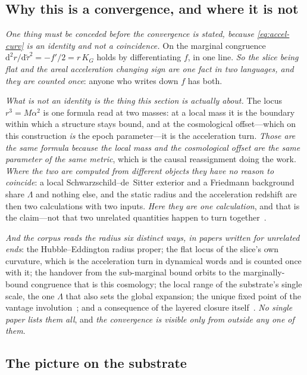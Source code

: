 \documentclass[11pt,a4paper]{article}
\newcommand{\dd}{\mathrm{d}}
\theoremstyle{plain}
\theoremstyle{definition}
\begin{document}
\subsection{Why this is a convergence, and where it is not}

\emph{One thing must be conceded before the convergence is stated, because \eqref{eq:accel-curv} is an
identity and not a coincidence.} On the marginal congruence $\dd^{2}r/\dd\tilde\tau^{2}=-f'/2=r\,K_{G}$
holds by differentiating $f$, in one line. \emph{So the slice being flat and the areal acceleration changing
sign are one fact in two languages, and they are counted once}: anyone who writes down $f$ has both.

\emph{What is not an identity is the thing this section is actually about.} The locus $r^{3}=M\alpha^{2}$ is
one formula read at two masses: at a local mass it is the boundary within which a structure stays bound, and
at the cosmological offset---which on this construction \emph{is} the epoch parameter---it is the
acceleration turn. \emph{Those are the same formula because the local mass and the cosmological offset are
the same parameter of the same metric}, which is the causal reassignment doing the work.
\emph{Where the two are computed from different objects they have no reason to coincide}: a local
Schwarzschild--de~Sitter exterior and a Friedmann background share $\Lambda$ and nothing else, and the
static radius and the acceleration redshift are then two calculations with two inputs. \emph{Here they are
one calculation}, and that is the claim---not that two unrelated quantities happen to turn
together~\cite{JanzenShadowExistence}.

\emph{And the corpus reads the radius six distinct ways, in papers written for unrelated ends}: the
Hubble--Eddington radius proper; the flat locus of the slice's own curvature, which is the acceleration turn
in dynamical words and is counted once with it; the handover from the sub-marginal bound orbits to the
marginally-bound congruence that is this cosmology; the local range of the substrate's single scale, the one
$\Lambda$ that also sets the global expansion; the unique fixed point of the vantage
involution~\cite{JanzenGroupoid}; and a consequence of the layered
closure itself~\cite{JanzenShadowExistence, JanzenCRframework}. \emph{No single paper lists them all}, and
\emph{the convergence is visible only from outside any one of them}.

\subsection{The picture on the substrate}
\end{document}
